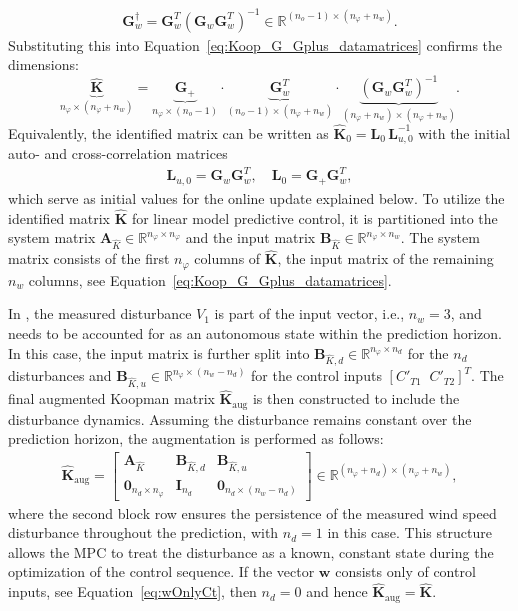 \begin{align*}
    \bm{G}_w^{\dagger} = \bm{G}_w^T (\bm{G}_w \bm{G}_w^T)^{-1} \in \mathbb{R}^{(n_o-1) \times (n_\varphi + n_w)}.
\end{align*}
Substituting this into Equation~\eqref{eq:Koop_G_Gplus_datamatrices} confirms the dimensions:
\[
\underbrace{\hat{\bm{K}}}_{n_\varphi \times (n_\varphi + n_w)} =
\underbrace{\bm{G}_{+}}_{n_\varphi \times (n_o-1)} \cdot
\underbrace{\bm{G}_w^T}_{(n_o-1) \times (n_\varphi + n_w)} \cdot
\underbrace{(\bm{G}_w \bm{G}_w^T)^{-1}}_{(n_\varphi + n_w) \times (n_\varphi + n_w)}.
\]
Equivalently, the identified matrix can be written as $\hat{\bm{K}}_0 = \mathbf{L}_0\,\mathbf{L}_{u,0}^{-1}$ with the initial auto- and cross-correlation matrices
\begin{align*}
    \mathbf{L}_{u,0} = \bm{G}_w \bm{G}_w^T, \quad \mathbf{L}_0 = \bm{G}_{+} \bm{G}_w^T,
\end{align*}
which serve as initial values for the online update explained below.
%
To utilize the identified matrix $\hat{\bm{K}}$ for linear model predictive control, it is partitioned into the system matrix $\bm{A}_{\hat{K}} \in \mathbb{R}^{n_\varphi \times n_\varphi}$ and the input matrix $\bm{B}_{\hat{K}} \in \mathbb{R}^{n_\varphi \times n_w}$. The system matrix consists of the first $n_\varphi$ columns of $\hat{\bm{K}}$, the input matrix of the remaining $n_w$ columns, see Equation~\eqref{eq:Koop_G_Gplus_datamatrices}.

In \cite{dittmer2022data}, the measured disturbance $V_1$ is part of the input vector, i.e., $n_w = 3$, and needs to be accounted for as an autonomous state within the prediction horizon. In this case, the input matrix is further split into $\bm{B}_{\hat{K},d} \in \mathbb{R}^{n_\varphi \times n_d}$ for the $n_d$ disturbances and $\bm{B}_{\hat{K},u} \in \mathbb{R}^{n_\varphi \times (n_w-n_d)}$ for the control inputs $[C'_{T1} \;\; C'_{T2}]^T$. The final augmented Koopman matrix $\hat{\bm{K}}_{\text{aug}}$ is then constructed to include the disturbance dynamics. Assuming the disturbance remains constant over the prediction horizon, the augmentation is performed as follows:
\begin{align}\label{eq:AugmentedKoopmanMPC}
    \hat{\bm{K}}_{\text{aug}} = \left[\begin{array}{cc|c}
        \bm{A}_{\hat{K}} & \bm{B}_{\hat{K},d} & \bm{B}_{\hat{K},u}\\
        \bm{0}_{n_d \times n_\varphi} & \bm{I}_{n_d} & \bm{0}_{n_d \times (n_w-n_d)}
    \end{array}\right] \in \mathbb{R}^{(n_\varphi+n_d) \times (n_\varphi+n_w)},
\end{align}
where the second block row ensures the persistence of the measured wind speed disturbance throughout the prediction, with $n_d = 1$ in this case. This structure allows the MPC to treat the disturbance as a known, constant state during the optimization of the control sequence. If the vector $\bm{w}$ consists only of control inputs, see Equation~\eqref{eq:wOnlyCt}, then $n_d = 0$ and hence $\hat{\bm{K}}_{\text{aug}} = \hat{\bm{K}}$.



